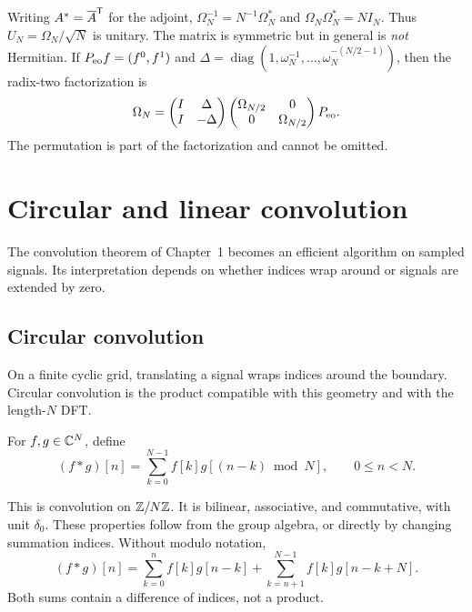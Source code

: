 \label{notation-47}
Writing $A^*=\overline{A}^{\mathsf T}$ for the adjoint,
$\Omega_N^{-1}=N^{-1}\Omega_N^*$ and $\Omega_N\Omega_N^*=NI_N$.
Thus $U_N=\Omega_N/\sqrt N$ is unitary. The matrix is symmetric but
in general is \emph{not} Hermitian.
If $P_{\rm eo}f=(f^0,f^1)$ and
$\Delta=\operatorname{diag}(1,\omega_N^{-1},\ldots,\omega_N^{-(N/2-1)})$,
then the radix-two factorization is
\[
 \Omega_N=
 \begin{pmatrix}I&\Delta\\I&-\Delta\end{pmatrix}
 \begin{pmatrix}\Omega_{N/2}&0\\0&\Omega_{N/2}\end{pmatrix}P_{\rm eo}.
\]
The permutation is part of the factorization and cannot be omitted.

\section{Circular and linear convolution}
\label{sect1-tfd-prod-convol}
The convolution theorem of Chapter~1 becomes an efficient algorithm on
sampled signals. Its interpretation depends on whether indices wrap around
or signals are extended by zero.

\subsection{Circular convolution}
\label{sect1-convolution-circular}

On a finite cyclic grid, translating a signal wraps indices around the
boundary. Circular convolution is the product compatible with this geometry
and with the length-$N$ DFT.

\begin{defn}
For $f,g\in\mathbb{C}^N$, define
\begin{equation}
\label{eq-convolution-discrete}
 (f*g)[n]=\sum_{k=0}^{N-1}f[k]g[(n-k)\bmod N],\qquad 0\leq n<N.
\end{equation}
\end{defn}
This is convolution on $\mathbb{Z}/N\mathbb{Z}$. It is bilinear, associative, and
commutative, with unit $\delta_0$. These properties follow from the group
algebra, or directly by changing summation indices. Without modulo notation,
\[
 (f*g)[n]=\sum_{k=0}^nf[k]g[n-k]
             +\sum_{k=n+1}^{N-1}f[k]g[n-k+N].
\]
Both sums contain a difference of indices, not a product.


